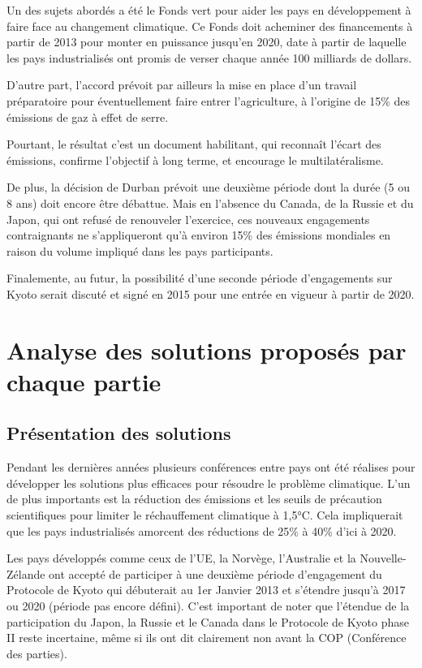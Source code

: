 \documentclass[a4paper,11pt]{article}
\begin{document}
Un des sujets abordés a été le Fonds vert pour aider les pays en développement à
faire face au changement climatique.  Ce Fonds doit acheminer des financements à
partir de 2013 pour monter en puissance jusqu'en 2020, date à partir de laquelle
les  pays industrialisés  ont promis  de verser  chaque année  100  milliards de
dollars.


D’autre  part, l'accord  prévoit  par ailleurs  la  mise en  place d'un  travail
préparatoire pour éventuellement faire entrer l'agriculture, à l'origine de 15\%
des émissions de gaz à effet de serre. 


Pourtant, le  résultat c’est un  document habilitant, qui reconnaît  l'écart des
émissions, confirme l'objectif à long terme, et encourage le multilatéralisme.


De plus, la décision de Durban prévoit  une deuxième période dont la durée (5 ou
8 ans) doit encore  être débattue. Mais en l'absence du Canada,  de la Russie et
du  Japon, qui  ont refusé  de renouveler  l'exercice, ces  nouveaux engagements
contraignants  ne s'appliqueront qu'à  environ 15\%  des émissions  mondiales en
raison du volume impliqué dans les pays participants.


Finalemente, au  futur, la possibilité  d'une seconde période  d'engagements sur
Kyoto serait  discuté et signé en  2015 pour une  entrée en vigueur à  partir de
2020. 


\section{Analyse des solutions proposés par chaque partie}

\subsection{Présentation des solutions}

Pendant les dernières  années plusieurs conférences entre pays  ont été réalises
pour  développer  les  solutions   plus  efficaces  pour  résoudre  le  problème
climatique. L’un de plus importants est la réduction des émissions et les seuils
de  précaution   scientifiques  pour  limiter  le   réchauffement  climatique  à
1,5°C. Cela impliquerait que les  pays industrialisés amorcent des réductions de
25\% à 40\% d'ici à 2020. 


Les  pays  développés  comme  ceux  de  l’UE,  la  Norvège,  l'Australie  et  la
Nouvelle-Zélande ont  accepté de participer à une  deuxième période d'engagement
du Protocole  de Kyoto qui débuterait  au 1er Janvier 2013  et s'étendre jusqu'à
2017 ou 2020 (période pas encore défini). C’est important de noter que l'étendue
de la participation du Japon, la Russie  et le Canada dans le Protocole de Kyoto
phase  II reste incertaine,  même si  ils ont  dit clairement  non avant  la COP
(Conférence des parties).
\end{document}
